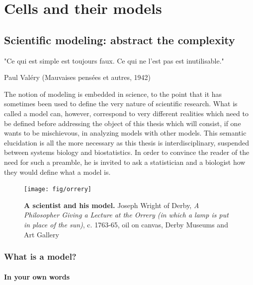 \documentclass[a4paper,12pt,twoside,onecolumn,openright,final,oldfontcommands]{memoir}
\newcommand{\initial}[1]{
	\lettrine[lines=3,lhang=0.33,nindent=0em]{
		\color{gray}
     		{\textsc{#1}}}{}}
\newcommand\blankpage{%
    \null
    \thispagestyle{empty}%
    \newpage
    }
\begin{document}
\blankpage


\part{Cells and their
models}\label{part-cells-and-their-models}

\chapter{Scientific modeling: abstract the
complexity}\label{scientific-modeling-abstract-the-complexity}

\epigraph{"Ce qui est simple est toujours faux. Ce qui ne l'est pas est inutilisable."}{Paul Valéry (Mauvaises pensées et autres, 1942)}

\initial{T}he notion of modeling is embedded in science, to the point
that it has sometimes been used to define the very nature of scientific
research. What is called a model can, however, correspond to very
different realities which need to be defined before addressing the
object of this thesis which will consist, if one wants to be
mischievous, in analyzing models with other models. This semantic
elucidation is all the more necessary as this thesis is
interdisciplinary, suspended between systems biology and biostatistics.
In order to convince the reader of the need for such a preamble, he is
invited to ask a statistician and a biologist how they would define what
a model is.

\begin{figure}

{\centering \texttt{[image: fig/orrery]} 

}

\caption[A scientist and his model]{\textbf{A scientist and his model.} Joseph Wright
of Derby, \emph{A Philosopher Giving a Lecture at the Orrery (in which a
lamp is put in place of the sun)}, c. 1763-65, oil on canvas, Derby
Museums and Art Gallery}\label{fig:orrery}
\end{figure}






\section{What is a model?}\label{what-is-a-model}

\subsection{In your own words}\label{in-your-own-words}
\end{document}
